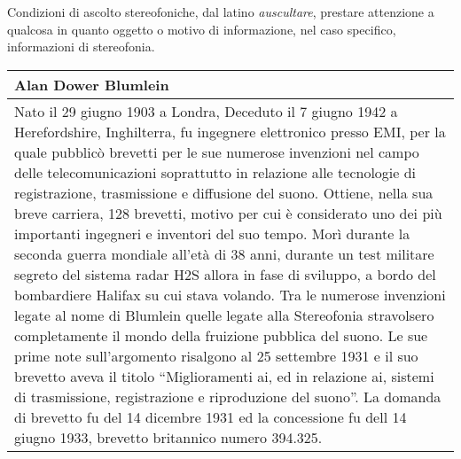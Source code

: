 Condizioni di ascolto stereofoniche, dal latino \emph{auscultare}, prestare
attenzione a qualcosa in quanto oggetto o motivo di informazione, nel caso specifico,
informazioni di stereofonia.

\vfill\null

\begin{table}[ht]
\footnotesize
\begin{tabular}{L{.969\textwidth}}%
\toprule
	\textbf{Alan Dower Blumlein}\\
\midrule
Nato il 29 giugno 1903 a Londra, Deceduto il 7 giugno 1942 a Herefordshire,
Inghilterra, fu ingegnere elettronico presso EMI, per la quale pubblicò brevetti
per le sue numerose invenzioni nel campo delle telecomunicazioni soprattutto in
relazione alle tecnologie di registrazione, trasmissione e diffusione del suono.
Ottiene, nella sua breve carriera, 128 brevetti, motivo per cui è considerato
uno dei più importanti ingegneri e inventori del suo tempo. Morì durante la
seconda guerra mondiale all'età di 38 anni, durante un test militare segreto del
sistema radar H2S allora in fase di sviluppo, a bordo del bombardiere Halifax
su cui stava volando. Tra le numerose invenzioni legate al nome di Blumlein
quelle legate alla Stereofonia stravolsero completamente il mondo della
fruizione pubblica del suono. Le sue prime note sull'argomento risalgono al 25
settembre 1931 e il suo brevetto aveva il titolo “Miglioramenti ai, ed in
relazione ai, sistemi di trasmissione, registrazione e riproduzione del suono”.
La domanda di brevetto fu del 14 dicembre 1931 ed la concessione fu dell
14 giugno 1933, brevetto britannico numero 394.325.\\
\bottomrule
\end{tabular}
\end{table}










